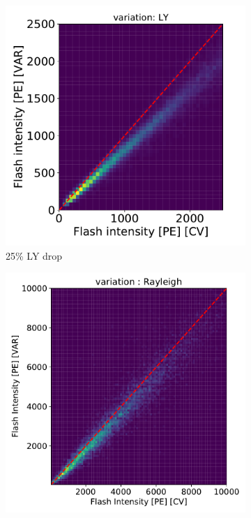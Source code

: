 \documentclass[a4paper]{article}
\begin{document}
\begin{figure}[H] 
\begin{center}
    \begin{subfigure}[b]{0.3\textwidth}
    \centering
    \includegraphics[width=1.00\textwidth]{detsys/light/flash_pe_corr_03232020_LY.pdf}
    \caption{\label{fig:detsys:flashpe:LY25}25\% LY drop}
    \end{subfigure}
    \begin{subfigure}[b]{0.3\textwidth}
    \centering
    \includegraphics[width=1.00\textwidth]{detsys/light/flash_pe_corr_02252020_Rayleigh_lowX.pdf}

\end{subfigure}
\end{center}
\end{figure}
\end{document}
